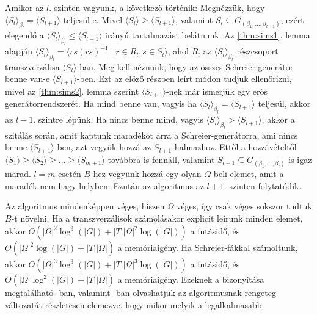 Amikor az $l$. szinten vagyunk, a következő történik:
Megnézzük, hogy $\langle S_l \rangle_{\beta_l} = \langle S_{l+1} \rangle$ teljesül-e.
Mivel $\langle S_l \rangle \ge \langle S_{l+1} \rangle$, valamint $S_l \subseteq G_{(\beta_1, \dots, \beta_{l-1})}$, ezért elegendő a $\langle S_l \rangle_{\beta_l} \le \langle S_{l+1} \rangle$ irányú tartalmazást belátnunk.
Az \ref{thm:sims1}. lemma alapján $\langle S_l \rangle_{\beta_l} = \langle rs(\overline{rs})^{-1} \mid r\in R_l, s\in S_l \rangle$, ahol $R_l$ az $\langle S_l \rangle_{\beta_l}$ részcsoport transzverzálisa $\langle S_l \rangle$-ban.
Meg kell néznünk, hogy az összes Schreier-generátor benne van-e $\langle S_{l+1} \rangle$-ben.
Ezt az előző részben leírt módon tudjuk ellenőrizni, mivel az \ref{thm:sims2}. lemma szerint $\langle S_{l+1} \rangle$-nek már ismerjük egy erős generátorrendszerét.
Ha mind benne van, vagyis ha $\langle S_l \rangle_{\beta_l} = \langle S_{l+1} \rangle$ teljesül, akkor az $l-1$. szintre lépünk.
Ha nincs benne mind, vagyis $\langle S_l \rangle_{\beta_l} > \langle S_{l+1} \rangle$, akkor a szitálás során, amit kaptunk maradékot arra a Schreier-generátorra, ami nincs benne $\langle S_{l+1} \rangle$-ben,
azt vegyük hozzá az $S_{l+1}$ halmazhoz.
Ettől a hozzávételtől $\langle S_1 \rangle \ge \langle S_2 \rangle \ge \dots \ge \langle S_{m+1} \rangle$ továbbra is fennáll, valamint $S_{l+1} \subseteq G_{(\beta_1, \dots, \beta_{l})}$ is igaz marad.
$l = m$ esetén $B$-hez vegyünk hozzá egy olyan $\Omega$-beli elemet, amit a maradék nem hagy helyben.
Ezután az algoritmus az $l+1$. szinten folytatódik.

Az algoritmus mindenképpen véges, hiszen $\Omega$ véges, így csak véges sokszor tudtuk $B$-t növelni.
Ha a transzverzálisok számolásakor explicit leírunk minden elemet, akkor $O(|\Omega|^2 \log^3(|G|) + |T||\Omega|^2 \log(|G|))$ a futásidő, és $O(|\Omega|^2 \log(|G|) + |T||\Omega|)$ a memóriaigény.
Ha Schreier-fákkal számoltunk, akkor $O(|\Omega|^3 \log^3(|G|) + |T||\Omega|^3 \log(|G|))$ a futásidő, és $O(|\Omega| \log^2(|G|) + |T||\Omega|)$ a memóriaigény.
Ezeknek a bizonyítása megtalálható \cite{Ser03}-ban, valamint \cite{Mur03}-ban olvashatjuk az algoritmusnak rengeteg változatát részletesen elemezve, hogy mikor melyik a legalkalmasabb.


